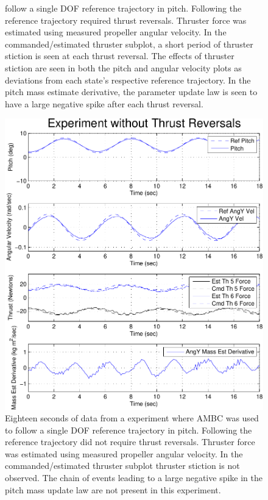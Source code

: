 \begin{center}
\begin{figure}[htbp]
{    follow a single \ac{DOF} reference trajectory in pitch.  Following
    the reference trajectory required thrust reversals. Thruster force
    was estimated using measured propeller angular velocity.  In the
    commanded/estimated thruster subplot, a short period of thruster
    stiction is seen at each thrust reversal.  The effects of thruster
    stiction are seen in both the pitch and angular velocity plots as
    deviations from each state's respective reference trajectory. In
    the pitch mass estimate derivative, the parameter update law is
    seen to have a large negative spike after each thrust reversal.}
  \label{chUV_AMBC.fig.stictionErrorWithThRev}
\end{figure}
\end{center}

\begin{center}
\begin{figure}[htbp]
  \begin{center}
    \includegraphics[width=150mm]{./chUV_AMBC/images/stictionErrorWoThrustReversals}
  \end{center}
  \caption{Eighteen seconds of data from a experiment where \ac{AMBC} was
    used to follow a single \ac{DOF} reference trajectory in pitch.
    Following the reference trajectory did not require thrust
    reversals. Thruster force was estimated using measured propeller
    angular velocity.  In the commanded/estimated thruster subplot
    thruster stiction is not observed.  The chain of events leading to a
    large negative spike in the pitch mass update law are not present
    in this experiment.}
  \label{chUV_AMBC.fig.stictionErrorWithoutThRev}
\end{figure}
\end{center}
